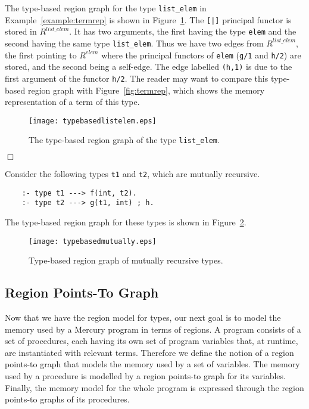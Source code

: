 \documentclass{tlp}
\newcommand{\code}[1]{{\tt#1}}
\begin{document}
\begin{example}
The type-based region graph for the type \code{list\_elem}
in Example~\ref{example:termrep}
is shown in Figure~\ref{fig:typebased:listelem}.
The \code{[|]} principal functor is stored in $R^{\mathit{list\_elem}}$.
It has two arguments, the first having the type \code{elem} and
the second having the same type \code{list\_elem}.
Thus we have two edges from $R^{\mathit{list\_elem}}$,
the first pointing to $R^{\mathit{elem}}$ where the principal functors of
\code{elem} (\code{g/1} and \code{h/2}) are stored,
and the second being a self-edge.
The edge labelled \code{(h,1)} is due to the first argument of the functor
\code{h/2}.
The reader may want to compare this type-based region graph
with Figure~\ref{fig:termrep},
which shows the memory representation of a term of this type.
\begin{figure}[htp]
\centering
\texttt{[image: typebasedlistelem.eps]}
\caption{The type-based region graph of the type \code{list\_elem}.}
\label{fig:typebased:listelem}
\end{figure}
\hfill $\Box$
\label{example:typebasedrptg}
\end{example}
\begin{example}
Consider the following types \code{t1} and \code{t2},
which are mutually recursive.
\begin{verbatim}
    :- type t1 ---> f(int, t2).
    :- type t2 ---> g(t1, int) ; h.
\end{verbatim}
The type-based region graph for these types
is shown in Figure~\ref{fig:typebased:mutually}.
\begin{figure}[htp]
\centering
\texttt{[image: typebasedmutually.eps]}
\caption{Type-based region graph of mutually recursive types.}
\label{fig:typebased:mutually}
\end{figure}
\end{example}

\subsection{Region Points-To Graph}

Now that we have the region model for types,
our next goal is to model the memory used by a Mercury program
in terms of regions.
A program consists of a set of procedures,
each having its own set of program variables
that, at runtime, are instantiated with relevant terms.
Therefore we define the notion of a region points-to graph
that models the memory used by a set of variables.
The memory used by a procedure
is modelled by a region points-to graph for its variables.
Finally, the memory model for the whole program
is expressed through the region points-to graphs of its procedures.
\end{document}
